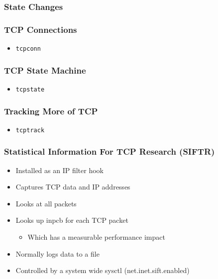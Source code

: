 \documentclass[pdftex]{beamer}
\begin{document}
\begin{frame}
  \frametitle{State Changes}
  
\end{frame}

\begin{frame}[fragile]
  \frametitle{TCP Connections}
  \begin{itemize}
  \item \verb|tcpconn|
  \end{itemize}
\end{frame}

\begin{frame}[fragile]
  \frametitle{TCP State Machine}
  \begin{itemize}
  \item \verb|tcpstate|
  \end{itemize}
\end{frame}

\begin{frame}[fragile]
  \frametitle{Tracking More of TCP}
  \begin{itemize}
  \item \verb|tcptrack|
  \end{itemize}
\end{frame}

\begin{frame}
  \frametitle{Statistical Information For TCP Research (SIFTR)}
  \begin{itemize}
  \item Installed as an IP filter hook
  \item Captures TCP data and IP addresses
  \item Looks at all packets
  \item Looks up inpcb for each TCP packet
    \begin{itemize}
    \item Which has a measurable performance impact
    \end{itemize}
  \item Normally logs data to a file
  \item Controlled by a system wide sysctl (net.inet.sift.enabled)
  \end{itemize}
\end{frame}
\end{document}
